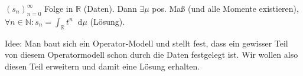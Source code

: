 \documentclass[letterpaper, 11pt]{article}
\newcommand{\R}{\mathbb{R}}
\newcommand{\N}{\mathbb{N}}
\newcommand{\1}{\mathds{1}}
\newcommand{\diff}{\mathop{}\!\mathrm{d}}
\theoremstyle{definition}
\begin{document}
\author{\normalsize Ian Hornik}
\date{\vspace{-0.8em}\normalsize\today}



$(s_n)_{n=0}^\infty$ Folge in $\R$ (Daten). Dann $\exists \mu$ pos. Maß (und alle Momente existieren), $\forall n \in \N : s_n = \int_\R t^n \diff \mu$ (Lösung).

Idee: Man baut sich ein Operator-Modell und stellt fest, dass ein gewisser Teil von diesem Operatormodell schon durch die Daten festgelegt ist. Wir wollen also diesen Teil erweitern und damit eine Lösung erhalten.
\end{document}

